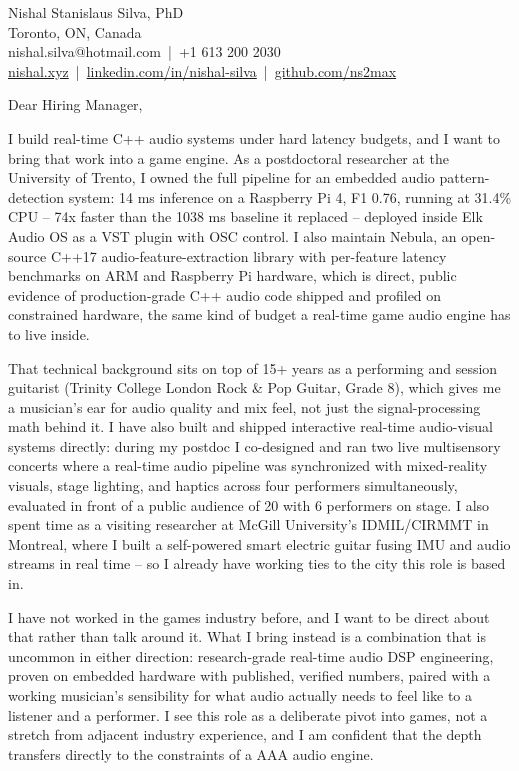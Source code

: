 \documentclass[11pt]{article}
\begin{document}
\pagestyle{empty}

\begin{flushleft}
Nishal Stanislaus Silva, PhD \\
Toronto, ON, Canada \\
nishal.silva@hotmail.com \,|\, +1 613 200 2030 \\
\href{https://nishal.xyz}{nishal.xyz} \,|\, \href{https://www.linkedin.com/in/nishal-silva}{linkedin.com/in/nishal-silva} \,|\, \href{https://github.com/ns2max}{github.com/ns2max}
\end{flushleft}

\vspace{1em}

Dear Hiring Manager,

I build real-time C++ audio systems under hard latency budgets, and I want to bring that work into a game engine. As a postdoctoral researcher at the University of Trento, I owned the full pipeline for an embedded audio pattern-detection system: 14 ms inference on a Raspberry Pi 4, F1 0.76, running at 31.4\% CPU -- 74x faster than the 1038 ms baseline it replaced -- deployed inside Elk Audio OS as a VST plugin with OSC control. I also maintain Nebula, an open-source C++17 audio-feature-extraction library with per-feature latency benchmarks on ARM and Raspberry Pi hardware, which is direct, public evidence of production-grade C++ audio code shipped and profiled on constrained hardware, the same kind of budget a real-time game audio engine has to live inside.

That technical background sits on top of 15+ years as a performing and session guitarist (Trinity College London Rock \& Pop Guitar, Grade 8), which gives me a musician's ear for audio quality and mix feel, not just the signal-processing math behind it. I have also built and shipped interactive real-time audio-visual systems directly: during my postdoc I co-designed and ran two live multisensory concerts where a real-time audio pipeline was synchronized with mixed-reality visuals, stage lighting, and haptics across four performers simultaneously, evaluated in front of a public audience of 20 with 6 performers on stage. I also spent time as a visiting researcher at McGill University's IDMIL/CIRMMT in Montreal, where I built a self-powered smart electric guitar fusing IMU and audio streams in real time -- so I already have working ties to the city this role is based in.

I have not worked in the games industry before, and I want to be direct about that rather than talk around it. What I bring instead is a combination that is uncommon in either direction: research-grade real-time audio DSP engineering, proven on embedded hardware with published, verified numbers, paired with a working musician's sensibility for what audio actually needs to feel like to a listener and a performer. I see this role as a deliberate pivot into games, not a stretch from adjacent industry experience, and I am confident that the depth transfers directly to the constraints of a AAA audio engine.
\end{document}
